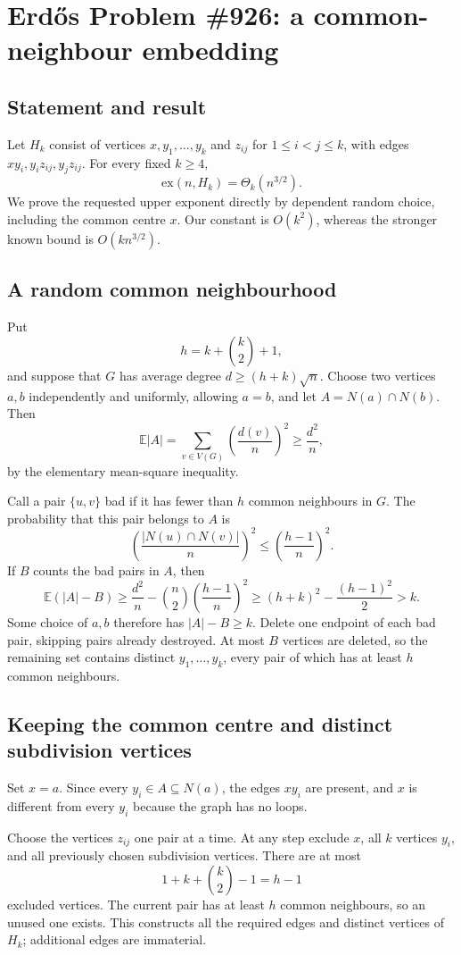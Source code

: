 \section*{Erd\H{o}s Problem \#926: a common-neighbour embedding}
\subsection*{Statement and result}
Let \(H_k\) consist of vertices \(x,y_1,\ldots,y_k\) and \(z_{ij}\) for \(1\leq i<j\leq k\), with edges \(xy_i,y_iz_{ij},y_jz_{ij}\). For every fixed \(k\geq4\),
\[
\mathrm{ex}(n,H_k)=\Theta_k(n^{3/2}).
\]
We prove the requested upper exponent directly by dependent random choice, including the common centre \(x\). Our constant is \(O(k^2)\), whereas the stronger known bound is \(O(kn^{3/2})\).

\subsection*{A random common neighbourhood}
Put
\[
h=k+\binom{k}{2}+1,
\]
and suppose that \(G\) has average degree \(d\geq(h+k)\sqrt n\). Choose two vertices \(a,b\) independently and uniformly, allowing \(a=b\), and let
\(A=N(a)\cap N(b)\). Then
\[
\mathbb E|A|=\sum_{v\in V(G)}\left(\frac{d(v)}n\right)^2
\geq\frac{d^2}{n}, \tag{1}
\]
by the elementary mean-square inequality.

Call a pair \(\{u,v\}\) bad if it has fewer than \(h\) common neighbours in \(G\). The probability that this pair belongs to \(A\) is
\[
\left(\frac{|N(u)\cap N(v)|}{n}\right)^2
\leq\left(\frac{h-1}{n}\right)^2.
\]
If \(B\) counts the bad pairs in \(A\), then
\[
\mathbb E(|A|-B)\geq\frac{d^2}{n}
-\binom n2\left(\frac{h-1}{n}\right)^2
\geq(h+k)^2-\frac{(h-1)^2}{2}>k. \tag{2}
\]
Some choice of \(a,b\) therefore has \(|A|-B\geq k\).
Delete one endpoint of each bad pair, skipping pairs already destroyed. At most \(B\) vertices are deleted, so the remaining set contains distinct \(y_1,\ldots,y_k\), every pair of which has at least \(h\) common neighbours.

\subsection*{Keeping the common centre and distinct subdivision vertices}
Set \(x=a\). Since every \(y_i\in A\subseteq N(a)\), the edges \(xy_i\) are present, and \(x\) is different from every \(y_i\) because the graph has no loops.

Choose the vertices \(z_{ij}\) one pair at a time. At any step exclude \(x\), all \(k\) vertices \(y_i\), and all previously chosen subdivision vertices. There are at most
\[
1+k+\binom{k}{2}-1=h-1
\]
excluded vertices. The current pair has at least \(h\) common neighbours, so an unused one exists. This constructs all the required edges and distinct vertices of \(H_k\); additional edges are immaterial.

